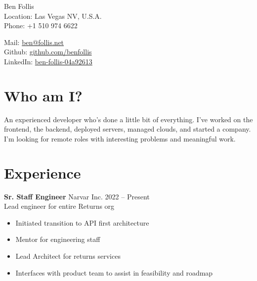 \documentclass{res}
\begin{document}


{\huge Ben Follis}\\

Location: {Las Vegas NV, U.S.A.}\\
Phone: {+1 510 974 6622}\\
\vspace{-\baselineskip} %

Mail: {\href{mailto:ben@follis.net}{ben@follis.net}}\\
Github: {\href{https://github.com/benfollis}{github.com/benfollis}}\\
LinkedIn: {\href{https://www.linkedin.com/in/ben-follis-04a92613}{ben-follis-04a92613}}\\



\section{Who am I?}
An experienced developer who's done a little bit of everything.
I've worked on the frontend, the backend, deployed servers, managed clouds, and started a company.
I'm looking for remote roles with interesting problems and meaningful work.


\section{Experience}
        {\bf Sr. Staff Engineer} \hfill Narvar Inc. \hfill 2022 -- Present \\
        Lead engineer for entire Returns org
        \begin{itemize}
           \item Initiated transition to API first architecture
           \item Mentor for engineering staff
           \item Lead Architect for returns services
          \item Interfaces with product team to assist in feasibility and roadmap
        \end{itemize}
        
\end{document}
